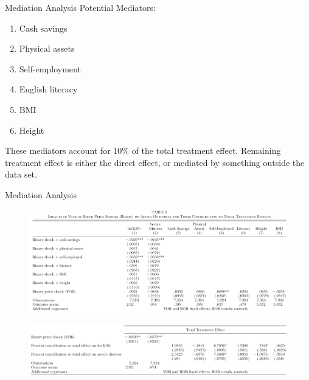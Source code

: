 \documentclass[dvipsnames]{beamer}
\begin{document}
    \begin{frame}{Mediation Analysis}
      Potential Mediators:
      \begin{enumerate}
      \item Cash savings
      \item Physical assets
      \item Self-employment
      \item English literacy
      \item BMI
        \item Height
        \end{enumerate}
        \begin{itemize}
          \vitem These mediators account for 10\% of the total treatment effect.
          \vitem Remaining treatment effect is either the direct effect, or mediated by something outside the data set.
        \end{itemize}
    \end{frame}
    \begin{frame}{Mediation Analysis}
      \begin{figure}[htp]
        \centering
       \includegraphics[width=\textwidth, keepaspectratio=true]{tab5-1.png} 
      \end{figure}
      \vspace{-3em}
      \begin{figure}[htp]
        \centering
       \includegraphics[width=\textwidth, keepaspectratio=true]{tab5-2.png} 
      \end{figure}
    \end{frame}
\end{document}
